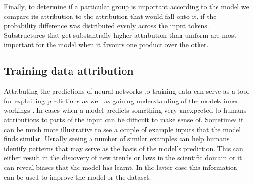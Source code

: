 Finally, to determine if a particular group is important according to the model we compare its attribution to the attribution that would fall onto it, if the probability difference was distributed evenly across the input tokens. Substructures that get substantially higher attribution than uniform are most important for the model when it favours one product over the other.

\subsection{Training data attribution} \label{subsec:data_attribution}
Attributing the predictions of neural networks to training data can serve as a tool for explaining predictions as well as gaining understanding of the models inner workings \cite{tetko2002}. In cases when a model predicts something very unexpected to humans attributions to parts of the input can be difficult to make sense of. Sometimes it can be much more illustrative to see a couple of example inputs that the model finds similar. Usually seeing a number of similar examples can help humans identify patterns that may serve as the basis of the model's prediction. This can either result in the discovery of new trends or laws in the scientific domain or it can reveal biases that the model has learnt. In the latter case this information can be used to improve the model or the dataset.

